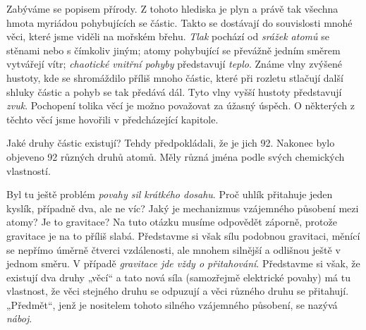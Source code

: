     Zabýváme se popisem přírody. Z tohoto hlediska je plyn a právě tak všechna hmota myriádou 
    pohybujících se částic. Takto se dostávají do souvislosti mnohé věci, které jsme viděli na 
    mořském břehu. \emph{Tlak} pochází od \emph{srážek atomů} se stěnami nebo s čímkoliv jiným; 
    atomy pohybující se převážně jedním směrem vytvářejí vítr; \emph{chaotické vnitřní pohyby} 
    představují \emph{teplo}. Známe vlny zvýšené hustoty, kde se shromáždilo příliš mnoho částic, 
    které při rozletu stlačují další shluky částic a pohyb se tak předává dál. Tyto vlny vyšší 
    hustoty představují \emph{zvuk}. Pochopení tolika věcí je možno považovat za úžasný úspěch. O 
    některých z těchto věcí jsme hovořili v předcházející kapitole.
    
    Jaké druhy částic existují? Tehdy předpokládali, že je jich 92. Nakonec bylo objeveno 92 
    různých druhů atomů. Měly různá jména podle svých chemických vlastností.
    
    Byl tu ještě problém \emph{povahy sil krátkého dosahu}. Proč uhlík přitahuje jeden kyslík, 
    případně dva, ale ne víc? Jaký je mechanizmus vzájemného působení mezi atomy? Je to gravitace? 
    Na tuto otázku musíme odpovědět záporně, protože gravitace je na to příliš slabá. Představme si 
    však sílu podobnou gravitaci, měnící se nepřímo úměrně čtverci vzdálenosti, ale mnohem silnější 
    a odlišnou ještě v jednom směru. V případě \emph{gravitace jde vždy o přitahování}. Představme 
    si však, že existují dva druhy „věcí“ a tato nová síla  (samozřejmě elektrické povahy) má tu 
    vlastnost, že věci stejného druhu se odpuzují a věci různého druhu se přitahují. „Předmět“, 
    jenž je nositelem tohoto silného vzájemného působení, se nazývá \emph{náboj}.  
    
